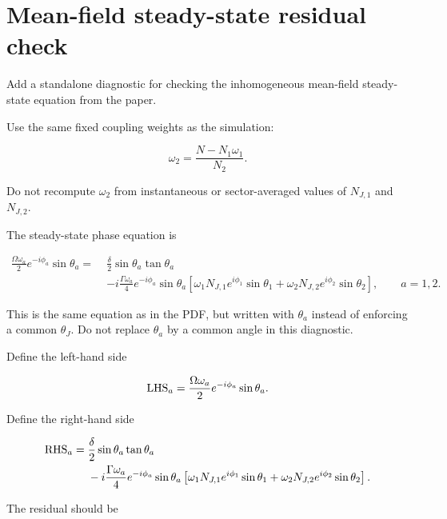 \documentclass[11pt]{article}
\begin{document}
\section*{Mean-field steady-state residual check}

Add a standalone diagnostic for checking the inhomogeneous mean-field
steady-state equation from the paper.

Use the same fixed coupling weights as the simulation:

\begin{equation}
\omega_2=\frac{N-N_1\omega_1}{N_2}.
\end{equation}

Do not recompute \(\omega_2\) from instantaneous or sector-averaged values of
\(N_{J,1}\) and \(N_{J,2}\).

The steady-state phase equation is

\begin{equation}
\begin{aligned}
\frac{\Omega\omega_a}{2}
e^{-i\phi_a}
\sin\theta_a
=\;&
\frac{\delta}{2}
\sin\theta_a
\tan\theta_a
\\
&-
i
\frac{\Gamma\omega_a}{4}
e^{-i\phi_a}
\sin\theta_a
\left[
\omega_1N_{J,1}e^{i\phi_1}\sin\theta_1
+
\omega_2N_{J,2}e^{i\phi_2}\sin\theta_2
\right],
\qquad
a=1,2.
\end{aligned}
\end{equation}

This is the same equation as in the PDF, but written with \(\theta_a\) instead
of enforcing a common \(\theta_J\). Do not replace \(\theta_a\) by a common angle
in this diagnostic.

Define the left-hand side

\begin{equation}
{\rm LHS}_a
=
\frac{\Omega\omega_a}{2}
e^{-i\phi_a}
\sin\theta_a.
\end{equation}

Define the right-hand side

\begin{equation}
\begin{aligned}
{\rm RHS}_a
=\;&
\frac{\delta}{2}
\sin\theta_a
\tan\theta_a
\\
&-
i
\frac{\Gamma\omega_a}{4}
e^{-i\phi_a}
\sin\theta_a
\left[
\omega_1N_{J,1}e^{i\phi_1}\sin\theta_1
+
\omega_2N_{J,2}e^{i\phi_2}\sin\theta_2
\right].
\end{aligned}
\end{equation}

The residual should be
\end{document}
